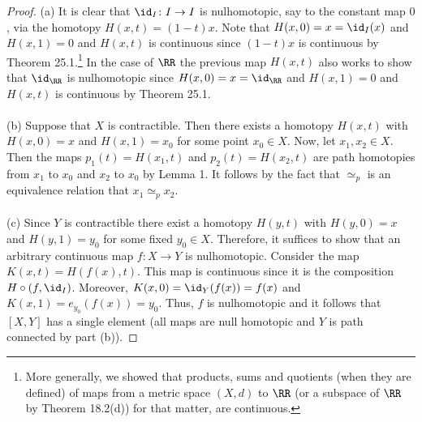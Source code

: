 \begin{proof}
(a) It is clear that $\id_I\colon I\to I$ is nulhomotopic, say to the
constant map $0$, via the homotopy $H(x,t)=(1-t)x$. Note that
$H(x,0)=x=\id_I(x)$ and $H(x,1)=0$ and $H(x,t)$ is continuous since
$(1-t)x$ is continuous by Theorem 25.1.\footnote{More generally, we showed
  that products, sums and quotients (when they are defined) of maps from a
  metric space $(X,d)$ to $\RR$ (or a subspace of $\RR$ by
  Theorem 18.2(d)) for that matter, are continuous.} In the case of $\RR$
the previous map $H(x,t)$ also works to show that $\id_{\RR}$ is
nulhomotopic since $H(x,0)=x=\id_{\RR}$ and $H(x,1)=0$ and $H(x,t)$ is
continuous by Theorem 25.1.
\\\\
(b) Suppose that $X$ is contractible. Then there exists a homotopy $H(x,t)$
with $H(x,0)=x$ and $H(x,1)=x_0$ for some point $x_0\in X$. Now, let
$x_1,x_2\in X$. Then the maps $p_1(t)=H(x_1,t)$ and $p_2(t)=H(x_2,t)$ are
path homotopies from $x_1$ to $x_0$ and $x_2$ to $x_0$ by Lemma
1. It follows by the fact that $\simeq_p$ is an equivalence
relation that $x_1\simeq_p x_2$.
\\\\
(c) Since $Y$ is contractible there exist a homotopy $H(y,t)$ with
$H(y,0)=x$ and $H(y,1)=y_0$ for some fixed $y_0\in X$. Therefore, it
suffices to show that an arbitrary continuous map $f\colon X\to Y$ is
nulhomotopic. Consider the map $K(x,t)=H(f(x),t)$. This map is continuous
since it is the composition $H\circ (f,\id_I)$. Moreover,
$K(x,0)=\id_Y(f(x))=f(x)$ and $K(x,1)=e_{y_0}(f(x))=y_0$. Thus, $f$ is
nulhomotopic and it follows that $[X,Y]$ has a single element (all maps are
null homotopic and $Y$ is path connected by part (b)).
\end{proof}

